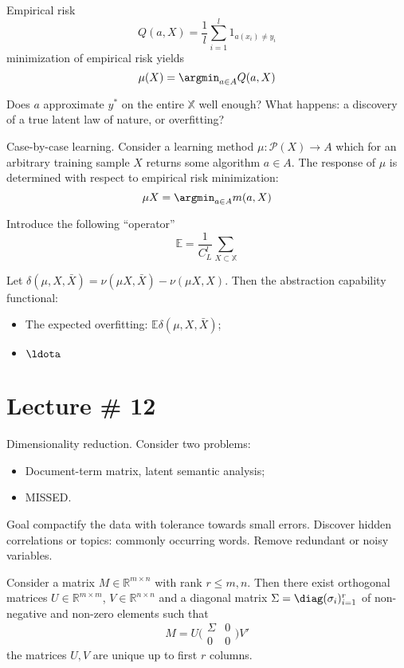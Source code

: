 \documentclass[a4paper]{article}
\newcommand{\Real}{\mathbb{R}}
\begin{document}
Empirical risk
\[Q(a,X) = \frac{1}{l} \sum_{i=1}^l 1_{a(x_i)\neq y_i}\]
minimization of empirical risk yields
\[
\mu(X) = \argmin_{a\in A} Q(a, X)\]

Does $a$ approximate $y^*$ on the entire $\mathbb{X}$ well enough? What happens:
a discovery of a true latent law of nature, or overfitting?

Case-by-case learning. Consider a learning method $\mu:\mathcal{P}(X)\to A$ which
for an arbitrary training sample $X$ returns some algorithm $a\in A$. The response
of $\mu$ is determined with respect to empirical risk minimization:
\[\mu X =\argmin_{a\in A} m(a, X)\]

Introduce the following ``operator''
\[\mathbb{E} = \frac{1}{C^l_L} \sum_{X\subset \mathbb{X}}\]

Let $\delta(\mu,X,\bar{X}) = \nu(\mu X,\bar{X})-\nu(\mu X, X)$. Then the abstraction
capability functional:
\begin{itemize}
	\item The expected overfitting: $\mathbb{E} \delta(\mu,X,\bar{X})$;
	\item $\ldota$
\end{itemize}


\section{Lecture \# 12} %
\label{sec:lecture_12}

Dimensionality reduction.
Consider two problems: \begin{itemize}
	\item Document-term matrix, latent semantic analysis;
	\item MISSED.
\end{itemize}

Goal compactify the data with tolerance towards small errors.
Discover hidden correlations or topics: commonly occurring words.
Remove redundant or noisy variables.

Consider a matrix $M\in \Real^{m\times n}$ with rank $r\leq m,n$. Then there exist
orthogonal matrices $U\in \Real^{m\times m}$, $V\in \Real^{n\times n}$ and
a diagonal matrix $\Sigma = \diag(\sigma_i)_{i=1}^r$ of non-negative and non-zero elements
such that 
\[ M = U \Biggl( \begin{smallmatrix} \Sigma & 0\\0 & 0 \end{smallmatrix} \Biggr) V' \]
the matrices $U,V$ are unique up to first $r$ columns.
\end{document}
